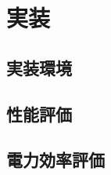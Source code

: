 \chapter{実装}
{
\label{chap:eval}

\section{実装環境}
\label{sec:impl_env}

\section{性能評価}
\label{sec:measure}

\section{電力効率評価}
\label{sec:measure}
}